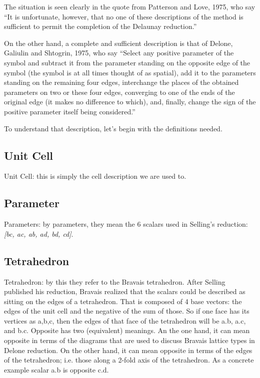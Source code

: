 \documentclass[11pt]{article} %
\begin{document}
The situation is seen clearly in the quote from Patterson and Love, 1975\cite{Patterson1957}, who say “It is unfortunate, however, that no one of these descriptions of the method is sufficient to permit the completion of the Delaunay reduction.”

On the other hand, a complete and sufficient description is that of Delone, Galiulin and Shtogrin, 1975\cite{Delone1975}, who say “Select any positive parameter of the symbol and subtract it from the parameter
standing on the opposite edge of the symbol (the symbol is at all times
thought of as spatial), add it to the parameters standing on the remaining four
edges, interchange the places of the obtained parameters on two or these four
edges, converging to one of the ends of the original edge (it makes no difference
to which), and, finally, change the sign of the positive parameter itself being
considered.”

To understand that description, let's begin with the definitions needed.

\subsection{Unit Cell}
Unit Cell: this is simply the cell description we are used to.

\subsection{Parameter}
Parameters: by parameters, they mean the 6 scalars used in Selling's reduction: \textit{[b{\textbullet}c, a{\textbullet}c, a{\textbullet}b, a{\textbullet}d, b{\textbullet}d, c{\textbullet}d]}.

\subsection{Tetrahedron}
Tetrahedron: by this they refer to the Bravais tetrahedron. After Selling published his reduction, Bravais realized that the scalars could be described as sitting on the edges of a tetrahedron. That is composed of 4 base vectors: the edges of the unit cell and the negative of the sum of those. So if one face has its vertices as a,b,c, then the edges of that face of the tetrahedron will be a.b, a.c, and b.c. Opposite has two (equivalent) meanings. An the one hand, it can mean opposite in terms of the diagrams that are used to discuss Bravais lattice types in Delone reduction. On the other hand, it can mean opposite in terms of the edges of the tetrahedron; i.e. those along a 2-fold axis of the tetrahedron. As a concrete example scalar a.b is opposite c.d.
\end{document}
